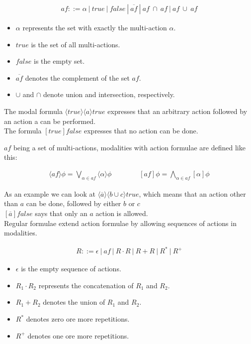 \documentclass{clseminar}
\begin{document}
  \pagebreak
  \begin{align*}
    \mathit{af} ::= \alpha\ |\ \mathit{true}\ |\ \mathit{false}\ |\ \overline{\mathit{af}}\ |\ \mathit{af}\ \cap\ \mathit{af}\ |\ \mathit{af}\ \cup\ \mathit{af}
  \end{align*}

  \begin{itemize}
    \item $\alpha$ represents the set with exactly the multi-action $\alpha$.
    \item $\mathit{true}$ is the set of all multi-actions.
    \item $\mathit{false}$ is the empty set.
    \item $\overline{\mathit{af}}$ denotes the complement of the set $\mathit{af}$.
    \item $\cup$ and $\cap$ denote union and intersection, respectively.
  \end{itemize}

  The modal formula $\langle true \rangle \langle a \rangle true$ expresses that an arbitrary action followed by an action a can be performed. \\
  The formula $[true]false$ expresses that no action can be done.

  $\mathit{af}$ being a set of multi-actions, modalities with action formulae are defined like this:

  \begin{align*}
    \langle{\mathit{af}}\rangle\phi = \bigvee_{\alpha \in \mathit{af}} \langle\alpha\rangle\phi
    \qquad\qquad
    [\mathit{af}]\phi = \bigwedge_{\alpha \in \mathit{af}} [\alpha]\phi
  \end{align*}

  As an example we can look at $\langle\overline{a}\rangle\langle{b \cup c}\rangle\mathit{true}$, which means that an action other than $a$ can be done, followed by either $b$ or $c$ \\
  $[\overline{a}]\mathit{false}$ says that only an $a$ action is allowed. \\

  Regular formulae extend action formulae by allowing sequences of actions in modalities.

  \begin{align*}
    R ::= \epsilon\ |\ \mathit{af}\ |\ R\cdot{R}\ |\ R+R\ |\ R^*\ |\ R^+
  \end{align*}

  \begin{itemize}
    \item $\epsilon$ is the empty sequence of actions.
    \item $R_1\cdot{R_2}$ represents the concatenation of $R_1$ and $R_2$.
    \item $R_1+R_2$ denotes the union of  $R_1$ and $R_2$.
    \item $R^*$ denotes zero ore more repetitions.
    \item $R^+$ denotes one ore more repetitions.
  \end{itemize}
\end{document}
